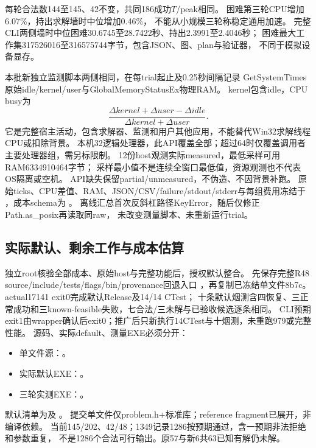 \documentclass[UTF8,fontset=fandol,11pt]{ctexart}
\begin{document}
每轮合法数144至145、42不变，共同186成功$T$/peak相同。
困难第三轮CPU增加6.07\%，持出求解墙时中位增加0.46\%，
不能从小规模三轮称稳定通用加速。
完整CLI两侧墙时中位困难30.6745至28.7422秒、持出2.3991至2.4046秒；
困难最大工作集317526016至316575744字节，包含JSON、图、plan与验证器，
不同于模拟设备显存。

本批新独立监测脚本两侧相同，在每trial起止及0.25秒间隔记录
GetSystemTimes原始idle/kernel/user与GlobalMemoryStatusEx物理RAM\cite{win32host}。
kernel包含idle，CPU busy为
\[
\frac{\Delta kernel+\Delta user-\Delta idle}{\Delta kernel+\Delta user}.
\]
它是完整宿主活动，包含求解器、监测和用户其他应用，不能替代Win32求解线程CPU或扣除背景。
本机32逻辑处理器，此API覆盖全部；超过64时仅覆盖调用者主要处理器组，需另标限制。
12份host观测实际measured，最低采样可用RAM6334910464字节；
采样最小值不是连续全窗口最低值，资源观测也不代表OS隔离或空机。
API缺失保留partial/unmeasured，不伪造、不因背景补跑。
原始ticks、CPU差值、RAM、JSON/CSV/failure/stdout/stderr与每组费用冻结于
，成本schema为
。
离线汇总首次反斜杠路径KeyError，随后仅修正Path.as\_posix再读取同raw，
未改变测量脚本、未重新运行trial。

\subsection{实际默认、剩余工作与成本估算}
独立root核验全部成本、原始host与完整功能后，授权默认整合。
先保存完整R48 source/include/tests/flags/bin/provenance回退入口
，再复制已冻结单文件8b7c。
actual17141 exit0完成默认Release及14/14 CTest；
十条默认烟测含四恢复、三正常成功和三known-feasible失败，七合法/三未解与已验收候选逐条相同。
CLI预期exit1由wrapper确认后exit0；推广后只新执行14CTest与十烟测，未重跑979或完整性能。
源码、实际default、测量EXE必须分开：
\begin{itemize}
\item 单文件源：。
\item 实际默认EXE：。
\item 三轮实测EXE：。
\end{itemize}
默认清单为及
。
提交单文件仅problem.h+标准库；reference fragment已展开，非编译依赖。
当前145/202、42/48；1349记录1286按预期通过，含一预期非法拒绝和参数重复，
不是1286个合法可行输出。原57与新6共63已知有解仍未解。
\end{document}
